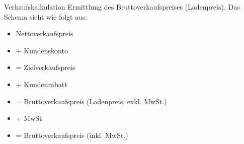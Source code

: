 \begin{definition}{Verkaufskalkulation}
     Ermittlung des Bruttoverkaufspreises (Ladenpreis). Das Schema sieht wie folgt aus:
\begin{itemize}
    \item Nettoverkaufspreis
    \item + Kundenskonto
    \item = Zielverkaufspreis
    \item + Kundenrabatt
    \item = Bruttoverkaufspreis (Ladenpreis, exkl. MwSt.)
    \item + MwSt.
    \item = Bruttoverkaufspreis (inkl. MwSt.)
\end{itemize}
\end{definition}
